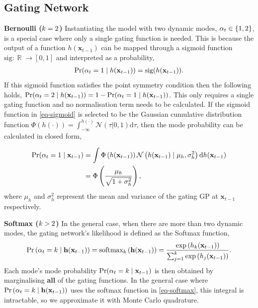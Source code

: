 \documentclass[twoside]{article}
\DeclareMathOperator{\R}{\mathbb{R}}
\newcommand{\numData}{\ensuremath{t}}
\newcommand{\modeInd}{\ensuremath{k}}
\newcommand{\ModeInd}{\ensuremath{\MakeUppercase{\modeInd}}}
\newcommand{\mode}[1]{\ensuremath{#1_{\modeInd}}}
\newcommand{\x}{\ensuremath{\mathbf{x}}}
\newcommand{\singleInput}{\ensuremath{\x_{\numData-1}}}
\newcommand{\modeVar}{\ensuremath{\alpha}}
\newcommand{\gatingFunc}{\ensuremath{h}}
\newcommand{\GatingFunc}{\ensuremath{\mathbf{\gatingFunc}}}
\begin{document}
\subsection{Gating Network \label{sec-gating-network-app}}
\label{sec:org1505d78}
\textbf{Bernoulli (\(\ModeInd=2\))} Instantiating the model with two dynamic modes, \(\singleModeVar \in \{1, 2\}\), is a special case
where only a single gating function is needed.
This is because the output of a function \(\gatingFunc(\singleInput)\) can be mapped through a sigmoid
function \(\text{sig} : \R \rightarrow [0, 1]\) and interpreted as a probability,
\begin{align} \label{eq-sigmoid}
\Pr(\singleModeVar=1 \mid \gatingFunc(\singleInput)) = \text{sig}(\gatingFunc(\singleInput)).
\end{align}
If this sigmoid function satisfies the point symmetry condition then
the following holds,
\(\Pr(\singleModeVar=2 \mid \gatingFunc(\singleInput)) = 1 - \Pr(\singleModeVar=1 \mid \gatingFunc(\singleInput))\).
This only requires a single gating function and no normalisation term needs to be calculated.
If the sigmoid function in \cref{eq-sigmoid} is selected
to be the Gaussian cumulative distribution function
\(\Phi(\gatingFunc(\cdot)) = \int^{\gatingFunc(\cdot)}_{-\infty} \mathcal{N}(\tau | 0, 1) \text{d} \tau\),
then the mode probability can be calculated in closed form,

\begin{align} \label{eq-mixing-probabilities-analytic}
\Pr(\modeVar_{\timeInd}=1 \mid \singleInput) &=
 \int \Phi\left(\gatingFunc(\singleInput)\right) \mathcal{N}\left(\gatingFunc(\singleInput) \mid \mu_h, \sigma^2_h \right) \text{d} \gatingFunc(\singleInput) \nonumber \\
&= \Phi \left(\frac{\mu_{h}}{\sqrt{1 + \sigma^2_{h} }}\right),
\end{align}
where \(\mu_h\) and \(\sigma^2_{h}\) represent the mean and variance of the gating GP at \(\singleInput\) respectively.

\textbf{Softmax (\(\ModeInd>2\))} In the general case, when there are more than two dynamic modes,
the gating network's likelihood is defined as the Softmax function,
\begin{align} \label{eq-softmax}
\singleGatingLikelihood = \text{softmax}_{\modeInd}\left(\GatingFunc(\singleInput)\right) = \frac{\text{exp}\left(\mode{\gatingFunc}(\singleInput)\right)}{\sum_{j=1}^{\ModeInd} \text{exp}\left(\gatingFunc_j(\singleInput) \right)}.
\end{align}
Each mode's mode probability \(\Pr(\modeVar_{\timeInd}=\modeInd \mid \singleInput)\) is then obtained by marginalising
\textbf{all} of the gating functions.
In the general case where \(\singleGatingLikelihood\) uses the softmax function in
\cref{eq-softmax}, this integral is intractable, so we approximate it with Monte Carlo quadrature.
\end{document}

